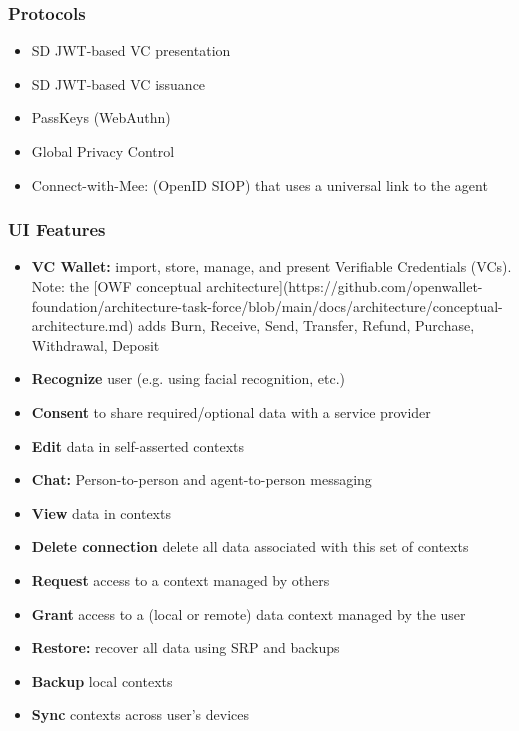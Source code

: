 \documentclass[11pt, oneside]{article}   	%
\begin{document}
\subsubsection{Protocols}

\begin{itemize}
\item SD JWT-based VC presentation
\item SD JWT-based VC issuance
\item PassKeys (WebAuthn)
\item Global Privacy Control
\item Connect-with-Mee: (OpenID SIOP) that uses a universal link to the agent
\end{itemize}

\subsubsection{UI Features}

\begin{itemize}
\item \textbf{VC Wallet:} import, store, manage, and present Verifiable Credentials (VCs). Note: the [OWF conceptual architecture](https://github.com/openwallet-foundation/architecture-task-force/blob/main/docs/architecture/conceptual-architecture.md) adds Burn, Receive, Send, Transfer, Refund, Purchase, Withdrawal, Deposit
\item \textbf{Recognize} user (e.g. using facial recognition, etc.)
\item \textbf{Consent} to share required/optional data with a service provider
\item \textbf{Edit} data in self-asserted contexts
\item \textbf{Chat:} Person-to-person and agent-to-person messaging
\item \textbf{View} data in contexts
\item \textbf{Delete connection} delete all data associated with this set of contexts
\item \textbf{Request} access to a context managed by others
\item \textbf{Grant} access to a (local or remote) data context managed by the user
\item  \textbf{Restore:} recover all data using SRP and backups
\item \textbf{Backup} local contexts
\item \textbf{Sync} contexts across user's devices
\end{itemize}
\end{document}
